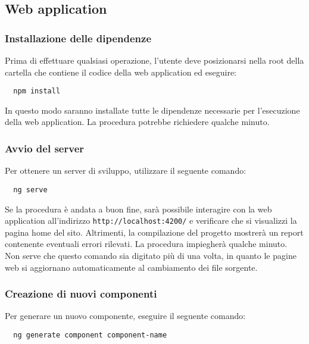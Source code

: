 \documentclass[../manuale-manutentore.tex]{subfiles}
\begin{document}
\subsection{Web application}%
\label{sub:web_application}

\subsubsection{Installazione delle dipendenze}%
\label{subs:installazione_delle_dipendenze}

Prima di effettuare qualsiasi operazione, l'utente deve posizionarsi nella root della cartella che contiene il codice della web application ed eseguire:

\begin{verbatim}
  npm install
\end{verbatim}

In questo modo saranno installate tutte le dipendenze necessarie per l'esecuzione della web application.
La procedura potrebbe richiedere qualche minuto.

\subsubsection{Avvio del server}%
\label{subs:avvio_del_server}

Per ottenere un server di sviluppo, utilizzare il seguente comando:

\begin{verbatim}
  ng serve
\end{verbatim}

Se la procedura è andata a buon fine, sarà possibile interagire con la web application all'indirizzo \texttt{http://localhost:4200/} e verificare che si visualizzi la pagina home del sito.
Altrimenti, la compilazione del progetto mostrerà un report contenente eventuali errori rilevati.
La procedura impiegherà qualche minuto.
Non serve che questo comando sia digitato più di una volta, in quanto le pagine web si aggiornano automaticamente al cambiamento dei file sorgente.

\subsubsection{Creazione di nuovi componenti}%
\label{subs:creazione_dei_nuovi_componenti}

Per generare un nuovo componente, eseguire il seguente comando:

\begin{verbatim}
  ng generate component component-name
\end{verbatim}
\end{document}
